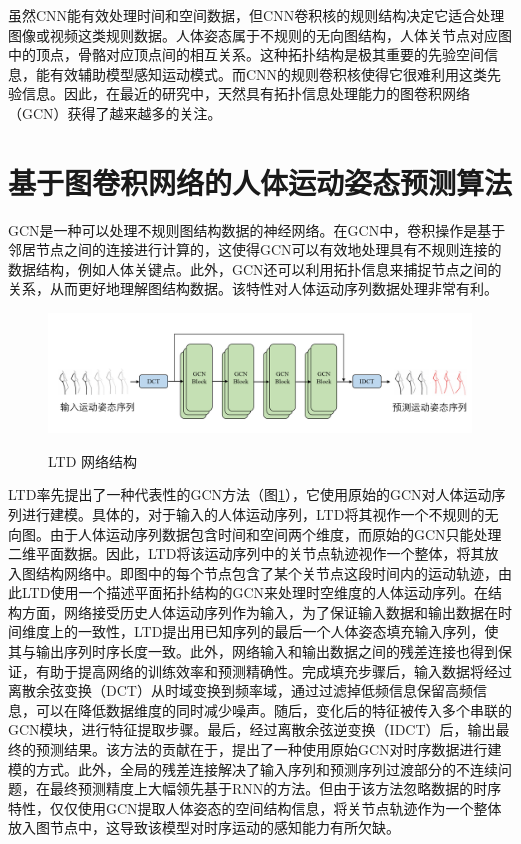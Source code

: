 虽然CNN能有效处理时间和空间数据，但CNN卷积核的规则结构决定它适合处理图像或视频这类规则数据。人体姿态属于不规则的无向图结构，人体关节点对应图中的顶点，骨骼对应顶点间的相互关系。这种拓扑结构是极其重要的先验空间信息，能有效辅助模型感知运动模式。而CNN的规则卷积核使得它很难利用这类先验信息。因此，在最近的研究中，天然具有拓扑信息处理能力的图卷积网络（GCN）获得了越来越多的关注。


\section{基于图卷积网络的人体运动姿态预测算法}
GCN是一种可以处理不规则图结构数据的神经网络。在GCN中，卷积操作是基于邻居节点之间的连接进行计算的，这使得GCN可以有效地处理具有不规则连接的数据结构，例如人体关键点。此外，GCN还可以利用拓扑信息来捕捉节点之间的关系，从而更好地理解图结构数据。该特性对人体运动序列数据处理非常有利。

\begin{figure}[ht]
    \centering
    \includegraphics[width=1\textwidth]{FigMa/LTD.png}\\
    \vspace{-0.3cm}
    \caption{LTD 网络结构}
    \label{fig:LTD}
\end{figure}
LTD\parencite{mao2019learning}率先提出了一种代表性的GCN方法（图\ref{fig:LTD}），它使用原始的GCN对人体运动序列进行建模。具体的，对于输入的人体运动序列，LTD将其视作一个不规则的无向图。由于人体运动序列数据包含时间和空间两个维度，而原始的GCN只能处理二维平面数据。因此，LTD将该运动序列中的关节点轨迹视作一个整体，将其放入图结构网络中。即图中的每个节点包含了某个关节点这段时间内的运动轨迹，由此LTD使用一个描述平面拓扑结构的GCN来处理时空维度的人体运动序列。在结构方面，网络接受历史人体运动序列作为输入，为了保证输入数据和输出数据在时间维度上的一致性，LTD提出用已知序列的最后一个人体姿态填充输入序列，使其与输出序列时序长度一致。此外，网络输入和输出数据之间的残差连接也得到保证，有助于提高网络的训练效率和预测精确性。完成填充步骤后，输入数据将经过离散余弦变换（DCT）从时域变换到频率域，通过过滤掉低频信息保留高频信息，可以在降低数据维度的同时减少噪声。随后，变化后的特征被传入多个串联的GCN模块，进行特征提取步骤。最后，经过离散余弦逆变换（IDCT）后，输出最终的预测结果。该方法的贡献在于，提出了一种使用原始GCN对时序数据进行建模的方式。此外，全局的残差连接解决了输入序列和预测序列过渡部分的不连续问题，在最终预测精度上大幅领先基于RNN的方法。但由于该方法忽略数据的时序特性，仅仅使用GCN提取人体姿态的空间结构信息，将关节点轨迹作为一个整体放入图节点中，这导致该模型对时序运动的感知能力有所欠缺。

